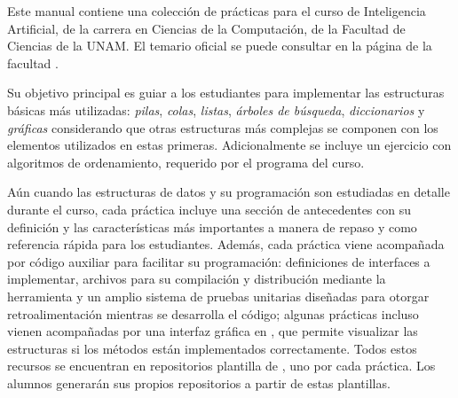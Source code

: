 
Este manual contiene una colección de prácticas para el curso de Inteligencia Artificial, de la carrera en Ciencias de la Computación, de la Facultad de Ciencias de la UNAM.  El temario oficial se puede consultar en la página de la facultad .






Su objetivo principal es guiar a los estudiantes para implementar las estructuras básicas más utilizadas: \textit{pilas}, \textit{colas}, \textit{listas}, \textit{árboles de búsqueda}, \textit{diccionarios} y \textit{gráficas} considerando que otras estructuras más complejas se componen con los elementos utilizados en estas primeras.  Adicionalmente se incluye un ejercicio con algoritmos de ordenamiento, requerido por el programa del curso.

Aún cuando las estructuras de datos y su programación son estudiadas en detalle durante el curso, cada práctica incluye una sección de antecedentes con su definición y las características más importantes a manera de repaso y como referencia rápida para los estudiantes.   Además, cada práctica viene acompañada por código auxiliar para facilitar su programación: definiciones de interfaces a implementar, archivos  para su compilación y distribución mediante la herramienta  y un amplio sistema de pruebas unitarias diseñadas para otorgar retroalimentación mientras se desarrolla el código; algunas prácticas incluso vienen acompañadas por una interfaz gráfica en , que permite visualizar las estructuras si los métodos están implementados correctamente.  Todos estos recursos se encuentran en repositorios plantilla de , uno por cada práctica.  Los alumnos generarán sus propios repositorios a partir de estas plantillas.

